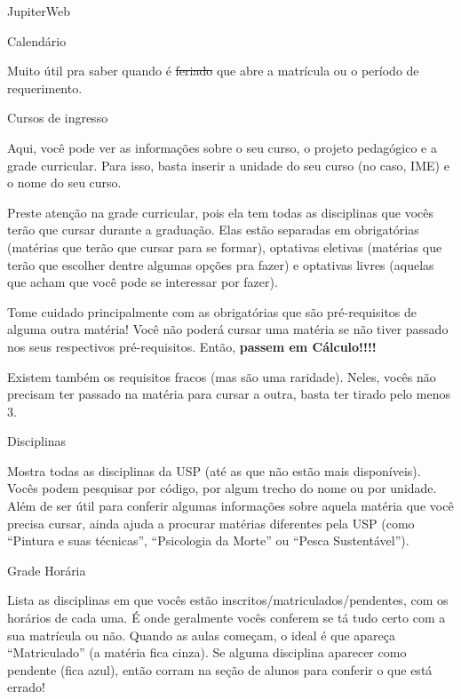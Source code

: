 \begin{secao}{JupiterWeb}
\begin{subsecao}{Calendário}

Muito útil pra saber quando é \sout{feriado} que abre a matrícula ou o período
de requerimento.

\end{subsecao}

\begin{subsecao}{Cursos de ingresso}

Aqui, você pode ver as informações sobre o seu curso, o projeto pedagógico e
a grade curricular. Para isso, basta inserir a unidade do seu curso (no caso,
IME) e o nome do seu curso.

Preste atenção na grade curricular, pois ela tem todas as disciplinas que
vocês terão que cursar durante a graduação. Elas estão separadas em obrigatórias
(matérias que terão que cursar para se formar), optativas eletivas (matérias
que terão que escolher dentre algumas opções pra fazer) e optativas livres
(aquelas que acham que você pode se interessar por fazer).

Tome cuidado principalmente com as obrigatórias que são pré-requisitos de
alguma outra matéria! Você não poderá cursar uma matéria se não tiver passado
nos seus respectivos pré-requisitos. Então, \textbf{passem em Cálculo!!!!}

Existem também os requisitos fracos (mas são uma raridade). Neles, vocês não 
precisam ter passado na matéria para cursar a outra, basta ter tirado pelo menos 3.

\end{subsecao}

\begin{subsecao}{Disciplinas}

Mostra todas as disciplinas da USP (até as que não estão mais disponíveis).
Vocês podem pesquisar por código, por algum trecho do nome ou por unidade. 
Além de ser útil para conferir algumas informações sobre aquela matéria que 
você precisa cursar, ainda ajuda a procurar matérias diferentes pela USP 
(como “Pintura e suas técnicas”, “Psicologia da Morte” ou “Pesca Sustentável”).

\end{subsecao}

\begin{subsecao}{Grade Horária}

Lista as disciplinas em que vocês estão inscritos/matriculados/pendentes, com os
horários de cada uma. É onde geralmente vocês conferem se tá tudo certo com a
sua matrícula ou não. Quando as aulas começam, o ideal é que apareça
“Matriculado” (a matéria fica cinza). Se alguma disciplina aparecer como
pendente (fica azul), então corram na seção de alunos para conferir o que está
errado!


\end{subsecao}
\end{secao}
